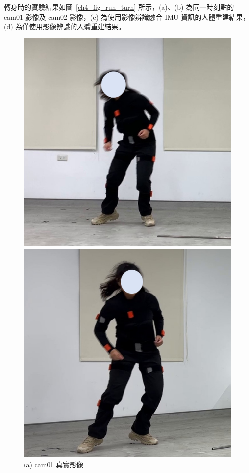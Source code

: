 \clearpage

轉身時的實驗結果如圖~\ref{ch4_fig_run_turn} 所示，(a)、(b) 為同一時刻點的 cam01 影像及 cam02 影像，(c) 為使用影像辨識融合 IMU 資訊的人體重建結果，(d) 為僅使用影像辨識的人體重建結果。

\begin{figure}[!ht]
   \centering
   \begin{minipage}{.5\textwidth}
      \centering
      \includegraphics[width=.95\linewidth]{figure/ch4_fig_run_cam01_with2.jpg}
      \caption*{(a) cam01 真實影像}
    \end{minipage}%
    \begin{minipage}{.5\textwidth}
       \centering
       \includegraphics[width=.95\linewidth]{figure/ch4_fig_run_cam02_with2.jpg}

\end{minipage}
\end{figure}
